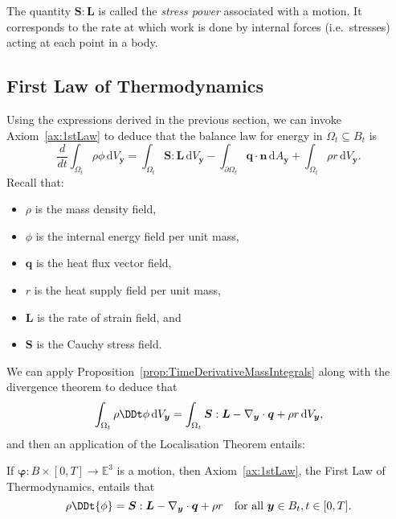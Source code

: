 \documentclass[
  letterpaper,
  DIV=11,
  numbers=noendperiod]{scrreprt}
\theoremstyle{plain}
\theoremstyle{remark}
\begin{document}
The quantity \({\boldsymbol{S}}:{\boldsymbol{L}}\) is called the
\emph{stress power} associated with a motion. It corresponds to the rate
at which work is done by internal forces (i.e.~stresses) acting at each
point in a body.

\subsection{First Law of
Thermodynamics}\label{first-law-of-thermodynamics}

Using the expressions derived in the previous section, we can invoke
Axiom~\hyperref[ax:1stLaw]{{[}ax:1stLaw{]}} to deduce that the balance
law for energy in \(\Omega_t\subseteq B_t\) is
\[\frac{d}{dt}\int_{\Omega_t} \rho\phi{\,{\mathrm{d}}V_{{\boldsymbol{y}}}}= \int_{\Omega_t}{\boldsymbol{S}}:{\boldsymbol{L}}{\,{\mathrm{d}}V_{{\boldsymbol{y}}}}-\int_{\partial \Omega_t}{\boldsymbol{q}}\cdot{\boldsymbol{n}}{\,{\mathrm{d}}A_{{\boldsymbol{y}}}}+\int_{\Omega_t}\rho r{\,{\mathrm{d}}V_{{\boldsymbol{y}}}}.\]
Recall that:

\begin{itemize}
\item
  \(\rho\) is the mass density field,
\item
  \(\phi\) is the internal energy field per unit mass,
\item
  \({\boldsymbol{q}}\) is the heat flux vector field,
\item
  \(r\) is the heat supply field per unit mass,
\item
  \({\boldsymbol{L}}\) is the rate of strain field, and
\item
  \({\boldsymbol{S}}\) is the Cauchy stress field.
\end{itemize}

We can apply
Proposition~\hyperref[prop:TimeDerivativeMassIntegrals]{{[}prop:TimeDerivativeMassIntegrals{]}}
along with the divergence theorem to deduce that
\[\int_{\Omega_t} \rho\DDt\phi{\,{\mathrm{d}}V_{{\boldsymbol{y}}}}= \int_{\Omega_t}{\boldsymbol{S}}:{\boldsymbol{L}}-\nabla_{\boldsymbol{y}}\cdot{\boldsymbol{q}}+\rho r{\,{\mathrm{d}}V_{{\boldsymbol{y}}}},\]
and then an application of the Localisation Theorem entails:

If \({\boldsymbol{\varphi}}:B\times[0,T]\to{\mathbb{E}}^3\) is a motion,
then Axiom~\hyperref[ax:1stLaw]{{[}ax:1stLaw{]}}, the First Law of
Thermodynamics, entails that
\[\rho\DDt{\phi} = {\boldsymbol{S}}:{\boldsymbol{L}}-\nabla_{\boldsymbol{y}}\cdot{\boldsymbol{q}}+ \rho r\quad\text{for all }{\boldsymbol{y}}\in B_t,t\in[0,T].\]
\end{document}
